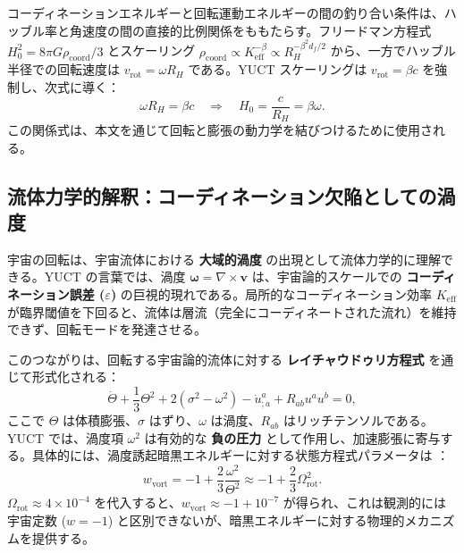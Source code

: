 \documentclass[11pt,a4paper]{article}
\begin{document}
	コーディネーションエネルギーと回転運動エネルギーの間の釣り合い条件は、ハッブル率と角速度の間の直接的比例関係をももたらす。フリードマン方程式 \(H_0^2 = 8\pi G \rho_{\mathrm{coord}} / 3\) とスケーリング \(\rho_{\mathrm{coord}} \propto K_{\mathrm{eff}}^{-\beta} \propto R_H^{-\beta^2 d_f /2}\) から、一方でハッブル半径での回転速度は \(v_{\mathrm{rot}} = \omega R_H\) である。YUCT スケーリングは \(v_{\mathrm{rot}} = \beta c\) を強制し、次式に導く：
	\begin{equation}
		\omega R_H = \beta c \quad \Rightarrow \quad H_0 = \frac{c}{R_H} = \beta \omega.
		\label{eq:H0-beta-omega}
	\end{equation}
	この関係式は、本文を通じて回転と膨張の動力学を結びつけるために使用される。
	
	\subsection{流体力学的解釈：コーディネーション欠陥としての渦度}
	
	宇宙の回転は、宇宙流体における \textbf{大域的渦度} の出現として流体力学的に理解できる。YUCT の言葉では、渦度 \(\boldsymbol{\omega} = \nabla \times \mathbf{v}\) は、宇宙論的スケールでの \textbf{コーディネーション誤差 (\(\varepsilon\))} の巨視的現れである。局所的なコーディネーション効率 \(K_{\mathrm{eff}}\) が臨界閾値を下回ると、流体は層流（完全にコーディネートされた流れ）を維持できず、回転モードを発達させる。
	
	このつながりは、回転する宇宙論的流体に対する \textbf{レイチャウドゥリ方程式} \cite{Ellis1971} を通じて形式化される：
	\begin{equation}
		\dot{\Theta} + \frac{1}{3}\Theta^2 + 2(\sigma^2 - \omega^2) - \dot{u}^a_{;a} + R_{ab}u^a u^b = 0,
	\end{equation}
	ここで \(\Theta\) は体積膨張、\(\sigma\) はずり、\(\omega\) は渦度、\(R_{ab}\) はリッチテンソルである。YUCT では、渦度項 \(\omega^2\) は有効的な \textbf{負の圧力} として作用し、加速膨張に寄与する。具体的には、渦度誘起暗黒エネルギーに対する状態方程式パラメータは \cite{Tsagas2011}：
	\begin{equation}
		w_{\mathrm{vort}} = -1 + \frac{2}{3}\frac{\omega^2}{\Theta^2} \approx -1 + \frac{2}{3}\Omega_{\mathrm{rot}}^2.
	\end{equation}
	\(\Omega_{\mathrm{rot}} \approx 4 \times 10^{-4}\) を代入すると、\(w_{\mathrm{vort}} \approx -1 + 10^{-7}\) が得られ、これは観測的には宇宙定数 (\(w = -1\)) と区別できないが、暗黒エネルギーに対する物理的メカニズムを提供する。
	
\end{document}

